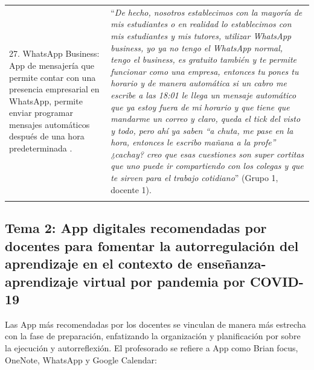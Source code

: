 \documentclass[spanish]{textolivre}
\begin{document}
\begin{longtable}{p{}p{}}
\\
27. WhatsApp Business: App de mensajería que permite contar con una presencia empresarial en WhatsApp, permite enviar programar mensajes automáticos después de una hora predeterminada \cite{whatsapp2021b}. &
“\emph{De hecho, nosotros establecimos con la mayoría de mis estudiantes o en realidad lo establecimos con mis estudiantes y mis tutores, utilizar WhatsApp business, yo ya no tengo el WhatsApp normal, tengo el business, es gratuito también y te permite funcionar como una empresa, entonces tu pones tu horario y de manera automática si un cabro me escribe a las 18:01 le llega un mensaje automático que ya estoy fuera de mi horario y que tiene que mandarme un correo y claro, queda el tick del visto y todo, pero ahí ya saben “a chuta, me pase en la hora, entonces le escribo mañana a la profe” ¿cachay?  creo que esas cuestiones son super cortitas que uno puede ir compartiendo con los colegas y que te sirven para el trabajo cotidiano}” (Grupo 1, docente 1).
\\
\arrayrulecolor{black}
\bottomrule
\end{longtable}

\subsection{Tema 2: App digitales recomendadas por docentes para fomentar la autorregulación del aprendizaje en el contexto de enseñanza-aprendizaje virtual por pandemia por COVID-19}
Las App más recomendadas por los  docentes se vinculan de manera más estrecha con la fase de preparación, enfatizando la organización y planificación por sobre la ejecución y autorreflexión. El profesorado se refiere a App como Brian focus, OneNote, WhatsApp y Google Calendar:
\end{document}
